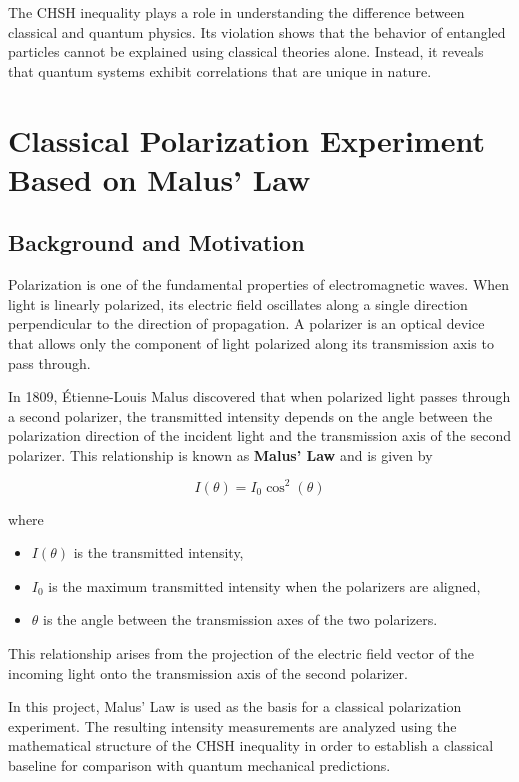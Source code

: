 \documentclass[17pt,a4paper]{extarticle}
\begin{document}
The CHSH inequality plays a role in understanding the difference between classical and quantum physics. Its violation shows that the behavior of entangled particles cannot be explained using classical theories alone. Instead, it reveals that quantum systems exhibit correlations that are unique in nature.

\section{Classical Polarization Experiment Based on Malus' Law}

\subsection{Background and Motivation}

Polarization is one of the fundamental properties of electromagnetic waves. When light is linearly polarized, its electric field oscillates along a single direction perpendicular to the direction of propagation. A polarizer is an optical device that allows only the component of light polarized along its transmission axis to pass through.

In 1809, Étienne-Louis Malus discovered that when polarized light passes through a second polarizer, the transmitted intensity depends on the angle between the polarization direction of the incident light and the transmission axis of the second polarizer. This relationship is known as \textbf{Malus' Law} and is given by

\[
I(\theta) = I_0 \cos^2(\theta)
\]

where

\begin{itemize}
\item $I(\theta)$ is the transmitted intensity,
\item $I_0$ is the maximum transmitted intensity when the polarizers are aligned,
\item $\theta$ is the angle between the transmission axes of the two polarizers.
\end{itemize}

This relationship arises from the projection of the electric field vector of the incoming light onto the transmission axis of the second polarizer.

In this project, Malus' Law is used as the basis for a classical polarization experiment. The resulting intensity measurements are analyzed using the mathematical structure of the CHSH inequality in order to establish a classical baseline for comparison with quantum mechanical predictions.
\end{document}
